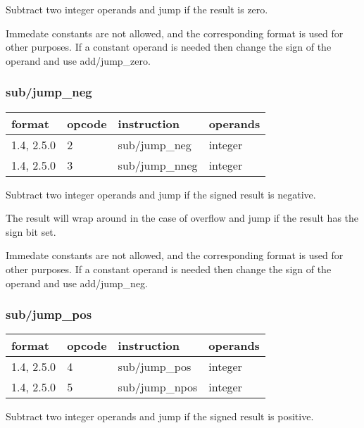 \documentclass[forwardcom.tex]{subfiles}
\begin{document}
Subtract two integer operands and jump if the result is zero.
\vspace{2mm}

Immedate constants are not allowed, and the corresponding format is used for other purposes.
If a constant operand is needed then change the sign of the operand and use add/jump\_zero. 

\subsubsection{sub/jump\_neg}
\label{table:subJumpNegInstruction}
\begin{tabular}{|p{16mm}|p{12mm}|p{60mm}|p{50mm}|}
\hline
\bfseries format & \bfseries opcode & \bfseries instruction & \bfseries operands \\ \hline
1.4, 2.5.0 &  2 & sub/jump\_neg & integer \\ \hline
1.4, 2.5.0 &  3 & sub/jump\_nneg & integer\\ \hline
\end{tabular}
\vspace{2mm}

Subtract two integer operands and jump if the signed result is negative.

The result will wrap around in the case of overflow and jump if the result has the sign bit set.
\vspace{2mm}

Immedate constants are not allowed, and the corresponding format is used for other purposes.
If a constant operand is needed then change the sign of the operand and use add/jump\_neg. 

\subsubsection{sub/jump\_pos}
\label{table:subJumpPosInstruction}
\begin{tabular}{|p{16mm}|p{12mm}|p{60mm}|p{50mm}|}
\hline
\bfseries format & \bfseries opcode & \bfseries instruction & \bfseries operands \\ \hline
1.4, 2.5.0 &  4 & sub/jump\_pos & integer \\ \hline
1.4, 2.5.0 &  5 & sub/jump\_npos & integer\\ \hline
\end{tabular}
\vspace{2mm}

Subtract two integer operands and jump if the signed result is positive.
\end{document}

